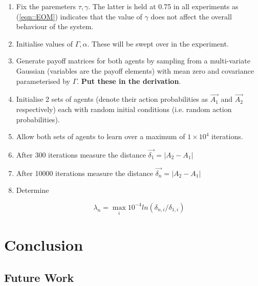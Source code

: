 \documentclass[letterpaper]{article} %
\begin{document}
   \begin{enumerate}
   	\item Fix the paremeters $\tau, \gamma$. The latter is held at 0.75 in all experiments as (\ref{eqn::EOM}) indicates that the value of $\gamma$ does not affect the overall behaviour of the system.
   	\item Initialise values of $\Gamma, \alpha$. These will be swept over in the experiment.
	\item Generate payoff matrices for both agents by sampling from a multi-variate Gaussian 
    (variables are the payoff elements) with mean zero and covariance parameterised by $\Gamma$. \textbf{Put these in the derivation}.
    \item Initialise 2 sets of agents (denote their action probabilities as $\Vec{A_1}$ and $\Vec{A_2}$ respectively) each with random initial conditions (i.e. random action probabilities).
    \item Allow both sets of agents to learn over a maximum of $1 \times 10^4$ iterations.
    \item After 300 iterations measure the distance $\Vec{\delta_1} = |A_2 - A_1|$
    \item After 10000 iterations measure the distance $\Vec{\delta_n} = |A_2 - A_1|$
    \item Determine 

    \begin{equation}
        \lambda_n = \max_{i} 10^{-4} ln(\delta_{n, i}/\delta_{1, i})
    \end{equation}

   \end{enumerate}


\section{Conclusion}

\subsection{Future Work}




\end{document}
